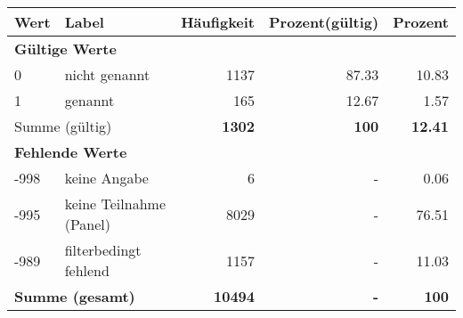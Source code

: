      \begin{longtable}{lXrrr}
     \toprule
     \textbf{Wert} & \textbf{Label} & \textbf{Häufigkeit} & \textbf{Prozent(gültig)} & \textbf{Prozent} \\
     \endhead
     \midrule
     \multicolumn{5}{l}{\textbf{Gültige Werte}}\\

     0 &
     \multicolumn{1}{X}{ nicht genannt   } &


       \num{1137} &
       \num[round-mode=places,round-precision=2]{87.33} &
         \num[round-mode=places,round-precision=2]{10.83} \\

     1 &
     \multicolumn{1}{X}{ genannt   } &


       \num{165} &
       \num[round-mode=places,round-precision=2]{12.67} &
         \num[round-mode=places,round-precision=2]{1.57} \\
     \midrule
     \multicolumn{2}{l}{Summe (gültig)} &
       \textbf{\num{1302}} &
     \textbf{\num{100}} &
       \textbf{\num[round-mode=places,round-precision=2]{12.41}} \\
     \multicolumn{5}{l}{\textbf{Fehlende Werte}}\\
       -998 &
       keine Angabe &
         \num{6} &
        - &
         \num[round-mode=places,round-precision=2]{0.06} \\
       -995 &
       keine Teilnahme (Panel) &
         \num{8029} &
        - &
         \num[round-mode=places,round-precision=2]{76.51} \\
       -989 &
       filterbedingt fehlend &
         \num{1157} &
        - &
         \num[round-mode=places,round-precision=2]{11.03} \\
     \midrule
     \multicolumn{2}{l}{\textbf{Summe (gesamt)}} &
          \textbf{\num{10494}} &
        \textbf{-} &
        \textbf{\num{100}} \\
     \bottomrule
     \end{longtable}
     
